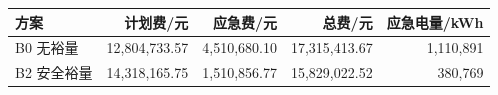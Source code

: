 \begin{tabular}{lrrrr}
\toprule
方案 & 计划费/元 & 应急费/元 & 总费/元 & 应急电量/kWh \\
\midrule
B0 无裕量 & 12,804,733.57 & 4,510,680.10 & 17,315,413.67 & 1,110,891 \\
B2 安全裕量 & 14,318,165.75 & 1,510,856.77 & 15,829,022.52 & 380,769 \\
\bottomrule
\end{tabular}
